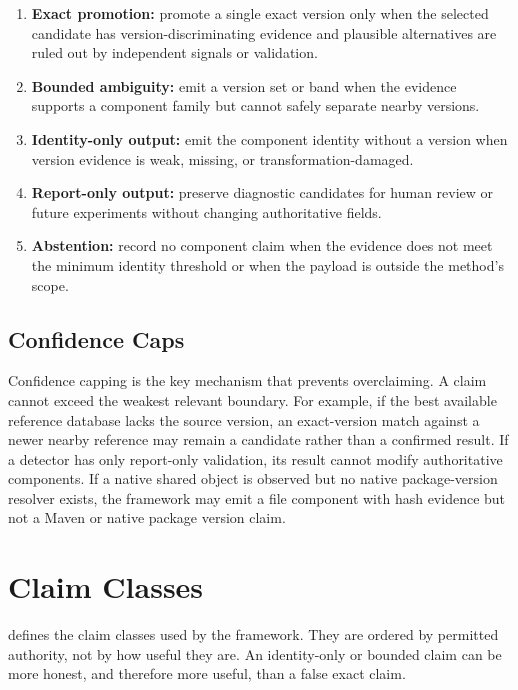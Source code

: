 \begin{enumerate}
  \item \textbf{Exact promotion:} promote a single exact version only when the
  selected candidate has version-discriminating evidence and plausible
  alternatives are ruled out by independent signals or validation.
  \item \textbf{Bounded ambiguity:} emit a version set or band when the
  evidence supports a component family but cannot safely separate nearby
  versions.
  \item \textbf{Identity-only output:} emit the component identity without a
  version when version evidence is weak, missing, or transformation-damaged.
  \item \textbf{Report-only output:} preserve diagnostic candidates for human
  review or future experiments without changing authoritative \SBOM fields.
  \item \textbf{Abstention:} record no component claim when the evidence does
  not meet the minimum identity threshold or when the payload is outside the
  method's scope.
\end{enumerate}

\subsection{Confidence Caps}

Confidence capping is the key mechanism that prevents overclaiming. A claim
cannot exceed the weakest relevant boundary. For example, if the best
available reference database lacks the source version, an exact-version match
against a newer nearby reference may remain a candidate rather than a
confirmed result. If a detector has only report-only validation, its result
cannot modify authoritative \CycloneDX components. If a native shared object is
observed but no native package-version resolver exists, the framework may
emit a file component with hash evidence but not a Maven or native package
version claim.

\section{Claim Classes}

 defines the claim classes used by the
framework. They are ordered by permitted authority, not by how useful they are.
An identity-only or bounded claim can be more honest, and therefore more
useful, than a false exact claim.


